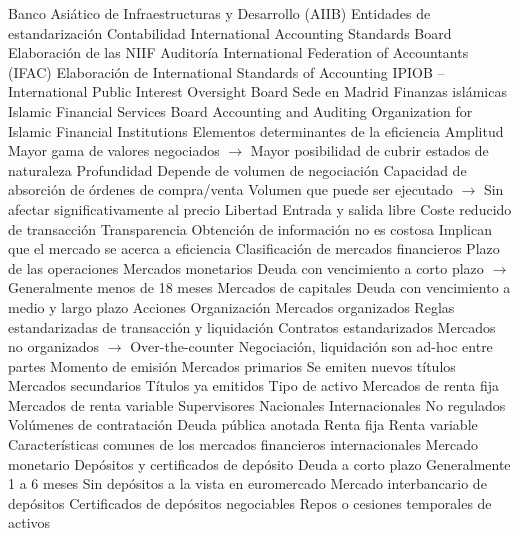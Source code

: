\documentclass{nuevotema}
\begin{document}
\begin{esquemal}
				\4 Banco Asiático de Infraestructuras y Desarrollo (AIIB)
		\2 Entidades de estandarización
			\3 Contabilidad
				\4 International Accounting Standards Board
				\4 Elaboración de las NIIF
			\3 Auditoría
				\4 International Federation of Accountants (IFAC)
				\4[] Elaboración de International Standards of Accounting
				\4 IPIOB -- International Public Interest Oversight Board
				\4[] Sede en Madrid
			\3 Finanzas islámicas
				\4 Islamic Financial Services Board
				\4 Accounting and Auditing Organization for Islamic Financial Institutions
	\1 
		\2 Elementos determinantes de la eficiencia
			\3 Amplitud
				\4 Mayor gama de valores negociados
				\4[] $\to$ Mayor posibilidad de cubrir estados de naturaleza
			\3 Profundidad
				\4 Depende de volumen de negociación
				\4 Capacidad de absorción de órdenes de compra/venta
				\4[] Volumen que puede ser ejecutado
				\4[] $\to$ Sin afectar significativamente al precio
			\3 Libertad
				\4 Entrada y salida libre
				\4 Coste reducido de transacción
			\3 Transparencia
				\4 Obtención de información no es costosa
			\3[$\then$] Implican que el mercado se acerca a eficiencia
		\2 Clasificación de mercados financieros
			\3 Plazo de las operaciones
				\4 Mercados monetarios
				\4[] Deuda con vencimiento a corto plazo
				\4[] $\to$ Generalmente menos de 18 meses
				\4 Mercados de capitales
				\4[] Deuda con vencimiento a medio y largo plazo
				\4[] Acciones
			\3 Organización
				\4 Mercados organizados
				\4[] Reglas estandarizadas de transacción y liquidación
				\4[] Contratos estandarizados
				\4 Mercados no organizados
				\4[] $\to$ Over-the-counter
				\4[] Negociación, liquidación son ad-hoc entre partes
			\3 Momento de emisión
				\4 Mercados primarios
				\4[] Se emiten nuevos títulos
				\4 Mercados secundarios
				\4[] Títulos ya emitidos
			\3 Tipo de activo
				\4 Mercados de renta fija
				\4 Mercados de renta variable
			\3 Supervisores
				\4 Nacionales
				\4 Internacionales
				\4 No regulados
			\3 Volúmenes de contratación
				\4 Deuda pública anotada
				\4 Renta fija
				\4 Renta variable
		\2 Características comunes de los mercados financieros internacionales
	\1 
		\2 Mercado monetario
			\3 Depósitos y certificados de depósito
				\4 Deuda a corto plazo
				\4 Generalmente 1 a 6 meses
				\4 Sin depósitos a la vista en euromercado
				\4 Mercado interbancario de depósitos
				\4 Certificados de depósitos negociables
			\3 Repos o cesiones temporales de activos

\end{esquemal}
\end{document}
